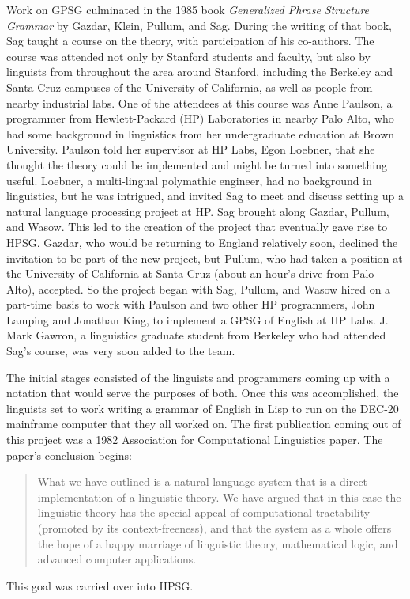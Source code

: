 \documentclass[output=paper
                ,modfonts
                ,nonflat
	        ,collection
	        ,collectionchapter
	        ,collectiontoclongg
 	        ,biblatex
                ,babelshorthands
                ,newtxmath
                ,draftmode
                ,colorlinks, citecolor=brown
]{./langsci/langscibook}
\begin{document}
Work on GPSG culminated in the 1985 book \textit{Generalized Phrase Structure Grammar} by Gazdar,  Klein, Pullum, and Sag.  During the writing of that book, Sag taught a course on the theory, with participation of his co-authors.  The course was attended not only by Stanford students and faculty, but also by linguists from throughout the area around Stanford, including the Berkeley and Santa Cruz campuses of the University of California, as well as people from nearby industrial labs.  One of the attendees at this course was Anne Paulson, a programmer from Hewlett-Packard (HP) Laboratories in nearby Palo Alto, who had some background in linguistics from her undergraduate education at Brown University.  Paulson told her supervisor at HP Labs, Egon Loebner, that she thought the theory could be implemented and might be turned into something useful. Loebner, a multi-lingual polymathic engineer, had no background in linguistics, but he was intrigued, and invited Sag to meet and discuss setting up a natural language processing project at HP. Sag brought along Gazdar, Pullum, and Wasow. This led to the creation of the project that eventually gave rise to HPSG.  Gazdar, who would be returning to England relatively soon, declined the invitation to be part of the new project, but Pullum, who had taken a position at the University of California at Santa Cruz (about an hour's drive from Palo Alto), accepted.  So the project began with Sag, Pullum, and Wasow hired on a part-time basis to work with Paulson and two other HP programmers, John Lamping and Jonathan King, to implement a GPSG of English at HP Labs.  J. Mark Gawron, a linguistics graduate student from Berkeley who had attended Sag's course, was very soon added to the team.

The initial stages consisted of the linguists and programmers coming up with a notation that would serve the purposes of both.  Once this was accomplished, the linguists set to work writing a grammar of English in Lisp to run on the DEC-20 mainframe computer that they all worked on.   The first publication coming out of this project was a 1982 Association for Computational Linguistics paper.  The paper's conclusion begins:
\begin{quote}
What we have outlined is a natural language system that is a direct implementation of a linguistic theory.  We have argued that in this case the linguistic theory has the special appeal of computational tractability (promoted by its context-freeness), and that the system as a whole offers the hope of a happy marriage of linguistic theory, mathematical logic, and advanced computer applications. \citep[]{Gaw:Kin:Lam:82}
\end{quote}
This goal was carried over into HPSG.
\end{document}
